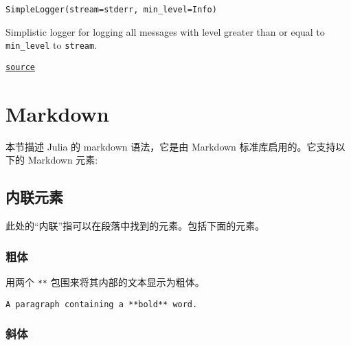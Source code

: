 \begin{adjustwidth}{2em}{0pt}


\begin{verbatim}
SimpleLogger(stream=stderr, min_level=Info)
\end{verbatim}

Simplistic logger for logging all messages with level greater than or equal to \texttt{min\_level} to \texttt{stream}.



\href{https://github.com/JuliaLang/julia/blob/9058264a69f9efc1af805c4473c946f87859b731/base/logging.jl#L617-L622}{\texttt{source}}


\end{adjustwidth}

\hypertarget{6677165778934209668}{}


\chapter{Markdown}



本节描述 Julia 的 markdown 语法，它是由 Markdown 标准库启用的。它支持以下的 Markdown 元素:



\hypertarget{1601338694572620533}{}


\section{内联元素}



此处的“内联”指可以在段落中找到的元素。包括下面的元素。



\hypertarget{1618085371866268555}{}


\subsection{粗体}



用两个 \texttt{**} 包围来将其内部的文本显示为粗体。




\begin{lstlisting}
A paragraph containing a **bold** word.
\end{lstlisting}



\hypertarget{9663056737922841330}{}


\subsection{斜体}



